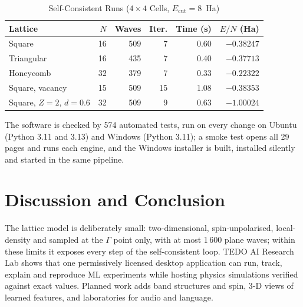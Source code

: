 \documentclass[conference]{IEEEtran}
\begin{document}
\begin{table}[t]
\caption{Self-Consistent Runs ($4\times4$ Cells, $E_{\mathrm{cut}}=8$~Ha)}
\label{tab:runs}
\centering
\setlength{\tabcolsep}{4pt}
\begin{tabular}{@{}lrrrrr@{}}
\toprule
Lattice & $N$ & Waves & Iter. & Time (s) & $E/N$ (Ha) \\
\midrule
Square & 16 & 509 & 7 & 0.60 & $-0.38247$ \\
Triangular & 16 & 435 & 7 & 0.40 & $-0.37713$ \\
Honeycomb & 32 & 379 & 7 & 0.33 & $-0.22322$ \\
Square, vacancy & 15 & 509 & 15 & 1.08 & $-0.38353$ \\
Square, $Z{=}2$, $d{=}0.6$ & 32 & 509 & 9 & 0.63 & $-1.00024$ \\
\bottomrule
\end{tabular}
\end{table}

The software is checked by 574 automated tests, run on every change on Ubuntu (Python 3.11 and
3.13) and Windows (Python 3.11); a smoke test opens all 29 pages and runs each engine, and the
Windows installer is built, installed silently and started in the same pipeline.

\section{Discussion and Conclusion}
The lattice model is deliberately small: two-dimensional, spin-unpolarised, local-density and
sampled at the $\Gamma$ point only, with at most 1\,600 plane waves; within these limits it exposes
every step of the self-consistent loop. TEDO AI Research Lab shows that one permissively licensed
desktop application can run, track, explain and reproduce ML experiments while hosting physics
simulations verified against exact values. Planned work adds band structures and spin, 3-D views
of learned features, and laboratories for audio and language.



\end{document}
